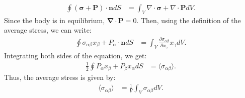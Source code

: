 \documentclass[a4paper]{article}
\newcommand{\dive}[1]{\mathbf{\nabla}\cdot \mathbf{#1}}
\begin{document}
\begin{align*}
  \oint (\mathbf{\sigma} + \mathbf{P}) \cdot \mathbf{n} dS &= \int_V \nabla \cdot \mathbf{\sigma} + \nabla \cdot \mathbf{P} dV.
\end{align*}Since the body is in equilibrium, $\dive{P}=0$. Then, using the definition of the average stress, we can write:
\begin{align*}
  \oint \sigma_{\alpha\beta} x_\beta + P_\alpha \cdot \mathbf{n} dS &= \int_V \frac{\partial \sigma_{\alpha\beta}}{\partial x_\gamma} x_\gamma dV.
\end{align*}Integrating both sides of the equation, we get:
\begin{align*}
  \frac{1}{2}\oint P_\alpha x_\beta + P_\beta x_\alpha dS &= \langle\sigma_{\alpha\beta}\rangle.
\end{align*}Thus, the average stress is given by:
\begin{align*}
  \langle\sigma_{\alpha\beta}\rangle &= \frac{1}{V}\int_V \sigma_{\alpha\beta}dV.
\end{align*}
\end{document}
